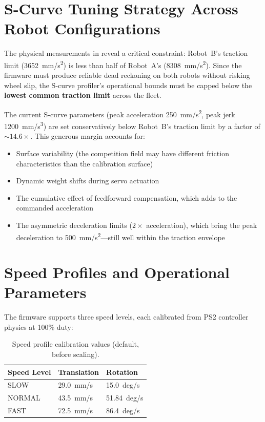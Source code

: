 \documentclass[12pt, a4paper, twoside]{article}
\begin{document}
\section{S-Curve Tuning Strategy Across Robot Configurations}
\label{sec:tuning}

The physical measurements in  reveal a critical constraint: Robot~B's traction limit (\SI{3652}{mm/s^2}) is less than half of Robot~A's (\SI{8308}{mm/s^2}). Since the firmware must produce reliable dead reckoning on both robots without risking wheel slip, the S-curve profiler's operational bounds must be capped below the \textbf{lowest common traction limit} across the fleet.

The current S-curve parameters (peak acceleration \SI{250}{mm/s^2}, peak jerk \SI{1200}{mm/s^3}) are set conservatively below Robot~B's traction limit by a factor of $\sim 14.6\times$. This generous margin accounts for:

\begin{itemize}
    \item Surface variability (the competition field may have different friction characteristics than the calibration surface)
    \item Dynamic weight shifts during servo actuation
    \item The cumulative effect of feedforward compensation, which adds to the commanded acceleration
    \item The asymmetric deceleration limits ($2\times$ acceleration), which bring the peak deceleration to \SI{500}{mm/s^2}---still well within the traction envelope
\end{itemize}

\section{Speed Profiles and Operational Parameters}
\label{sec:speed-profiles}

The firmware supports three speed levels, each calibrated from PS2 controller physics at 100\% duty:

\begin{table}[H]
    \centering
    \caption{Speed profile calibration values (default, before scaling).}
    \label{tab:speed-profiles}
    \begin{tabular}{@{}lll@{}}
        \toprule
        \textbf{Speed Level} & \textbf{Translation} & \textbf{Rotation} \\
        \midrule
        SLOW   & \SI{29.0}{mm/s}  & \SI{15.0}{deg/s} \\
        NORMAL & \SI{43.5}{mm/s}  & \SI{51.84}{deg/s} \\
        FAST   & \SI{72.5}{mm/s}  & \SI{86.4}{deg/s} \\
        \bottomrule
    \end{tabular}
\end{table}
\end{document}
